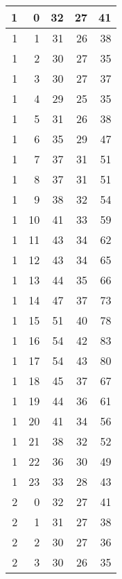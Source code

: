    \begin{longtable}{|r|r|r|r|r|}
		\hline
    1     & 0     & 32    & 27    & 41 \\
    \hline
    1     & 1     & 31    & 26    & 38 \\
    \hline
    1     & 2     & 30    & 27    & 35 \\
    \hline
    1     & 3     & 30    & 27    & 37 \\
    \hline
    1     & 4     & 29    & 25    & 35 \\
    \hline
    1     & 5     & 31    & 26    & 38 \\
    \hline
    1     & 6     & 35    & 29    & 47 \\
    \hline
    1     & 7     & 37    & 31    & 51 \\
    \hline
    1     & 8     & 37    & 31    & 51 \\
    \hline
    1     & 9     & 38    & 32    & 54 \\
    \hline
    1     & 10    & 41    & 33    & 59 \\
    \hline
    1     & 11    & 43    & 34    & 62 \\
    \hline
    1     & 12    & 43    & 34    & 65 \\
    \hline
    1     & 13    & 44    & 35    & 66 \\
    \hline
    1     & 14    & 47    & 37    & 73 \\
    \hline
    1     & 15    & 51    & 40    & 78 \\
    \hline
    1     & 16    & 54    & 42    & 83 \\
    \hline
    1     & 17    & 54    & 43    & 80 \\
    \hline
    1     & 18    & 45    & 37    & 67 \\
    \hline
    1     & 19    & 44    & 36    & 61 \\
    \hline
    1     & 20    & 41    & 34    & 56 \\
    \hline
    1     & 21    & 38    & 32    & 52 \\
    \hline
    1     & 22    & 36    & 30    & 49 \\
    \hline
    1     & 23    & 33    & 28    & 43 \\
    \hline
    2     & 0     & 32    & 27    & 41 \\
    \hline
    2     & 1     & 31    & 27    & 38 \\
    \hline
    2     & 2     & 30    & 27    & 36 \\
    \hline
    2     & 3     & 30    & 26    & 35 \\

\end{longtable}
